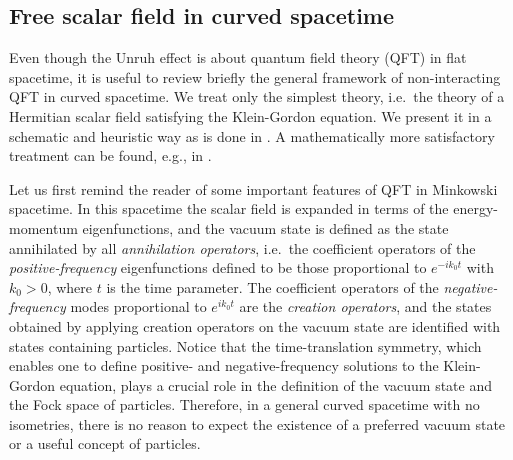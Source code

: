 \documentclass[12pt,nofootinbib,floatfix,aps,prd,showpacs,amsmath,amssymb,eqsecnum]{revtex4-2}
\begin{document}
\subsection{Free scalar field in curved spacetime}
\label{section2:curvedspace}

Even though the Unruh effect is about quantum field theory (QFT) 
in flat spacetime, 
it is useful to review briefly the general framework of non-interacting 
QFT in curved spacetime.  We treat only the simplest
theory, i.e.~the theory of a Hermitian scalar field satisfying the
Klein-Gordon equation.
We present it in a schematic and heuristic way as is done in
\textcite{Birrelletal82}.  
A mathematically more satisfactory treatment can be found, e.g., 
in \textcite{WaldQFTCS}. 

Let us first remind the reader of some important features of QFT in
Minkowski spacetime.
In this spacetime the scalar field is expanded in terms of the
energy-momentum eigenfunctions, and the vacuum state is defined as the
state annihilated by all {\em annihilation operators}, 
i.e.~the coefficient operators of the {\em positive-frequency}
eigenfunctions defined to be those proportional 
to $e^{-ik_0 t}$ with $k_0 > 0$, where $t$ is the time parameter.  The
coefficient operators of the {\em negative-frequency} 
modes proportional to
$e^{ik_0 t}$ are the {\em creation operators}, 
and the states obtained by
applying creation operators 
on the vacuum state are identified with states containing
particles.  Notice that the time-translation symmetry, 
which enables one to define positive- and negative-frequency
solutions to the Klein-Gordon equation, 
plays a crucial role 
in the definition of the vacuum state and the Fock space of particles.
Therefore, in a general curved spacetime with no isometries, there is no
reason to expect the existence of a preferred vacuum state or 
a useful concept of particles.
\end{document}
